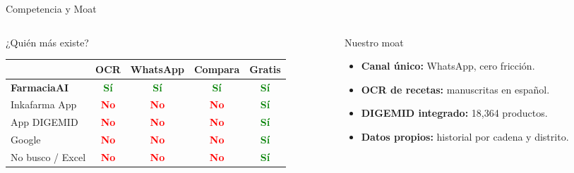 \documentclass[aspectratio=169,11pt]{beamer}
\newcommand{\tightlist}{\setlength\itemsep{2pt}\setlength\parskip{0pt}\setlength\parsep{0pt}}
\newcommand{\ok}{\textcolor{Green}{\textbf{Sí}}}
\newcommand{\nope}{\textcolor{Red}{\textbf{No}}}
\begin{document}
\begin{frame}[t]{Competencia y Moat}
\vspace{-0.3em}
\begin{columns}[T,onlytextwidth]
\begin{column}{0.61\textwidth}
\begin{block}{¿Quién más existe?}
\begin{adjustbox}{max width=\linewidth}
\begin{tabular}{lcccc}
\toprule
& \textbf{OCR} & \textbf{WhatsApp} & \textbf{Compara} & \textbf{Gratis} \\
\midrule
\textbf{FarmaciaAI} & \ok & \ok & \ok & \ok \\
Inkafarma App      & \nope & \nope & \nope & \ok \\
App DIGEMID        & \nope & \nope & \nope & \ok \\
Google             & \nope & \nope & \nope & \ok \\
No busco / Excel   & \nope & \nope & \nope & \ok \\
\bottomrule
\end{tabular}
\end{adjustbox}
\end{block}
\end{column}
\begin{column}{0.36\textwidth}
\begin{block}{Nuestro moat}
\begin{itemize}\tightlist
  \item \textbf{Canal único:} WhatsApp, cero fricción.
  \item \textbf{OCR de recetas:} manuscritas en español.
  \item \textbf{DIGEMID integrado:} 18,364 productos.
  \item \textbf{Datos propios:} historial por cadena y distrito.
\end{itemize}
\end{block}
\end{column}
\end{columns}
\end{frame}
\end{document}
